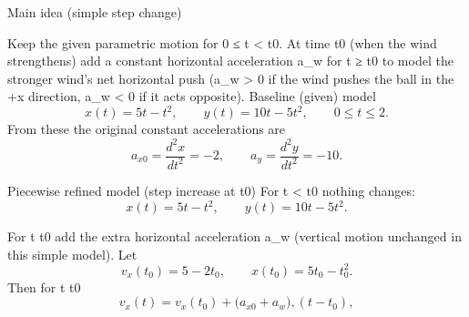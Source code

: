 Main idea (simple step change)

Keep the given parametric motion for 0 ≤ t < t0.
At time t0 (when the wind strengthens) add a constant horizontal acceleration a_w for t ≥ t0 to model the stronger wind’s net horizontal push (a_w > 0 if the wind pushes the ball in the +x direction, a_w < 0 if it acts opposite).
Baseline (given) model
$$
x(t)=5t - t^{2},\qquad y(t)=10t - 5t^{2},\qquad 0\le t\le 2.
$$
From these the original constant accelerations are
$$
a_{x0}=\frac{d^2 x}{dt^2}=-2,\qquad a_y=\frac{d^2 y}{dt^2}=-10.
$$

Piecewise refined model (step increase at t0)
For t < t0 nothing changes:
$$
x(t)=5t - t^{2},\qquad y(t)=10t - 5t^{2}.
$$

For t \ge t0 add the extra horizontal acceleration a_w (vertical motion unchanged in this simple model). Let
$$
v_x(t_0)=5-2t_0,\qquad x(t_0)=5t_0-t_0^2.
$$
Then for t \ge t0
$$
v_x(t)=v_x(t_0)+\bigl(a_{x0}+a_w\bigr),(t-t_0),
$$